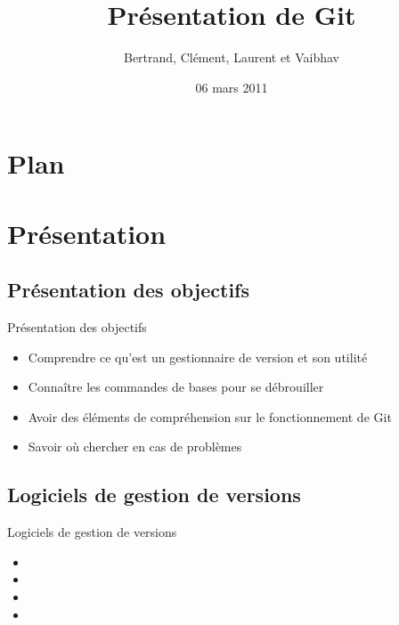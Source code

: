 \documentclass{beamer}
\title[ROSE]{Présentation de Git}
\author{Bertrand, Clément, Laurent et Vaibhav}
\institute{Télécom Paristech}
\date{06 mars 2011}
\begin{document}
\begin{frame}
  \titlepage
\end{frame}

\section*{Plan}
%

\section{Présentation}
\subsection*{Présentation des objectifs}
\begin{frame}{Présentation des objectifs}
  \begin{itemize}
  \item Comprendre ce qu'est un gestionnaire de version et son utilité
  \item Connaître les commandes de bases pour se débrouiller
  \item Avoir des éléments de compréhension sur le fonctionnement de Git
  \item Savoir où chercher en cas de problèmes
  \end{itemize}
\end{frame}

\subsection*{Logiciels de gestion de versions}
\begin{frame}{Logiciels de gestion de versions}
  \begin{itemize}
  \item 
  \item 
  \item 
  \item 
  \end{itemize}
\end{frame}
\end{document}
